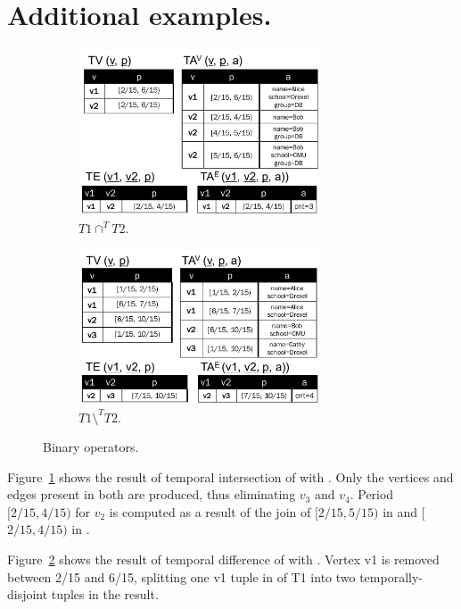 \appendix 

\section{Additional examples.}
\label{sec:app:examples}

\begin{figure}
\centering
\begin{subfigure}{3in}
\includegraphics[width=2.8in]{figs/T1_inter_T2_rel.pdf}
\caption{$T1 \cap^T T2$.}
\vspace{-0.2cm}
\label{fig:tg_inter}
\end{subfigure}
\begin{subfigure}{3in}
\includegraphics[width=2.8in]{figs/T1_diff_T2_rel.pdf}
\caption{$T1 \setminus^T T2$.}
\vspace{-0.2cm}
\label{fig:tg_diff}
\end{subfigure}
\caption{Binary operators.}
\label{fig:binary}
\vspace{-0.2cm}
\end{figure}

Figure~\ref{fig:tg_inter} shows the result of temporal intersection
of  with .  Only the vertices and edges present in
both \tgs are produced, thus eliminating $v_3$ and $v_4$.  Period
$[2/15, 4/15)$ for $v_2$ is computed as a result of the join of
$[2/15, 5/15)$ in  and [$2/15, 4/15)$ in .

Figure~\ref{fig:tg_diff} shows the result of temporal difference
of  with .  Vertex v1 is removed between 2/15 and
6/15, splitting one v1 tuple in \tv of T1 into two temporally-disjoint
tuples in the result.

